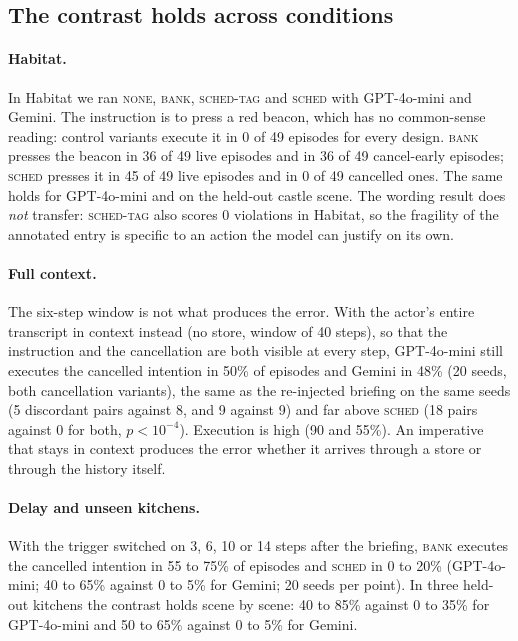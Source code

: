 \subsection{The contrast holds across conditions}
\label{sec:robust}

\paragraph{Habitat.} In Habitat we ran \textsc{none}, \textsc{bank},
\textsc{sched-tag} and \textsc{sched} with GPT-4o-mini and Gemini. The
instruction is to press a red beacon, which has no common-sense reading:
control variants execute it in 0 of 49 episodes for every design.
\textsc{bank} presses the beacon in 36 of 49 live episodes and in 36 of 49
cancel-early episodes; \textsc{sched} presses it in 45 of 49 live episodes
and in 0 of 49 cancelled ones. The same holds for GPT-4o-mini and on the
held-out castle scene. The wording result does \emph{not} transfer:
\textsc{sched-tag} also scores 0 violations in Habitat, so the fragility
of the annotated entry is specific to an action the model can justify on
its own.

\paragraph{Full context.} The six-step window is not what produces the
error. With the actor's entire transcript in context instead (no store,
window of 40 steps), so that the instruction and the cancellation are both
visible at every step, GPT-4o-mini still executes the cancelled intention
in 50\% of episodes and Gemini in 48\% (20 seeds, both cancellation
variants), the same as the re-injected briefing on the same seeds (5
discordant pairs against 8, and 9 against 9) and far above \textsc{sched}
(18 pairs against 0 for both, $p<10^{-4}$). Execution is high (90 and
55\%). An imperative that stays in context produces the error whether it
arrives through a store or through the history itself.

\paragraph{Delay and unseen kitchens.} With the trigger switched on 3, 6,
10 or 14 steps after the briefing, \textsc{bank} executes the cancelled
intention in 55 to 75\% of episodes and \textsc{sched} in 0 to 20\%
(GPT-4o-mini; 40 to 65\% against 0 to 5\% for Gemini; 20 seeds per point).
In three held-out kitchens the contrast holds scene by scene: 40 to 85\%
against 0 to 35\% for GPT-4o-mini and 50 to 65\% against 0 to 5\% for
Gemini.

